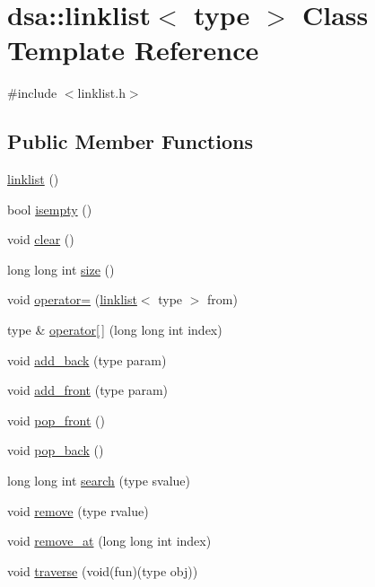 \hypertarget{classdsa_1_1linklist}{}\section{dsa\+:\+:linklist$<$ type $>$ Class Template Reference}
\label{classdsa_1_1linklist}


{\ttfamily \#include $<$linklist.\+h$>$}

\subsection*{Public Member Functions}
\begin{DoxyCompactItemize}
\item 
\hyperlink{classdsa_1_1linklist_af9adb0aac16e729d04a7bcee71bebd0d}{linklist} ()
\item 
bool \hyperlink{classdsa_1_1linklist_ab79de151e0dc05cd094df6d2ffef4336}{isempty} ()
\item 
void \hyperlink{classdsa_1_1linklist_aea88d17feb4e247c7643749c91226790}{clear} ()
\item 
long long int \hyperlink{classdsa_1_1linklist_a3f432226390169919561c67ac98b5bd3}{size} ()
\item 
void \hyperlink{classdsa_1_1linklist_aac8df7165a66811e8af38963b4d90432}{operator=} (\hyperlink{classdsa_1_1linklist}{linklist}$<$ type $>$ from)
\item 
type \& \hyperlink{classdsa_1_1linklist_ad646a31b694a1d63fd350202558b724d}{operator\mbox{[}$\,$\mbox{]}} (long long int index)
\item 
void \hyperlink{classdsa_1_1linklist_a3ef6c296e9381c244c88e81ded17cae5}{add\+\_\+back} (type param)
\item 
void \hyperlink{classdsa_1_1linklist_a5635713d959008510a0c7aafc4e1c858}{add\+\_\+front} (type param)
\item 
void \hyperlink{classdsa_1_1linklist_a16dccca4e9a99ab82c72e19912d2e6bf}{pop\+\_\+front} ()
\item 
void \hyperlink{classdsa_1_1linklist_ac2ed79a708e1cdf4aa27f0aae814c179}{pop\+\_\+back} ()
\item 
long long int \hyperlink{classdsa_1_1linklist_a600f0df997c7873b1755e351ca2423ff}{search} (type svalue)
\item 
void \hyperlink{classdsa_1_1linklist_a1cc5bbb33399fb62c5b4a56f55c91caf}{remove} (type rvalue)
\item 
void \hyperlink{classdsa_1_1linklist_a5620af63cea3feae47f4efe1afae1bb7}{remove\+\_\+at} (long long int index)
\item 
void \hyperlink{classdsa_1_1linklist_a678c45e9bc1336b4c6fed86f2e4457b9}{traverse} (void(fun)(type obj))
\end{DoxyCompactItemize}


